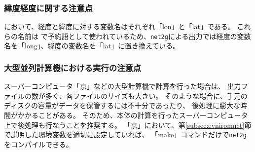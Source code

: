 
\subsubsection{緯度経度に関する注意点}
\scalerm において、経度と緯度に対する変数名はそれぞれ「lon」と「lat」である。
これらの名前は \grads で予約語として使われているため、\verb|net2g|による出力では経度の変数名を「long」、緯度の変数名を「lat」に置き換えている。

\subsubsection{大型並列計算機における実行の注意点}
スーパーコンピュータ「京」などの大型計算機で計算を行った場合は、
出力ファイルの数が多く、各ファイルのサイズも大きい。
そのような場合に、手元のディスクの容量がデータを保管するには不十分であったり、
後処理に膨大な時間がかかることがある。
そのため、\scalerm 本体の計算を行ったスーパーコンピュータ上で後処理も行なうことを推奨する。
「京」において、第\ref{subsec:evniromnet}節で説明した環境変数を適切に設定していれば、
「make」コマンドだけで\verb|net2g|をコンパイルできる。




